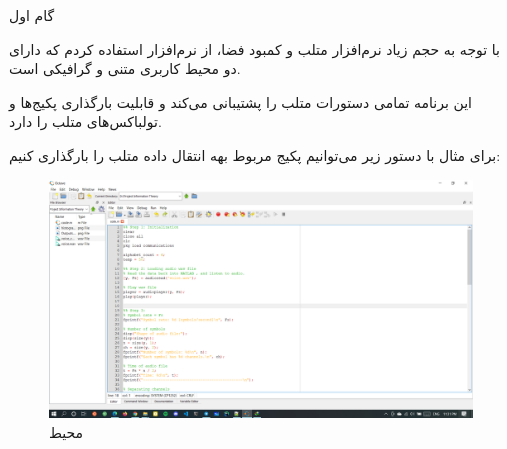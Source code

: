 \Problem
{گام اول}
{
    با توجه به حجم زیاد نرم‌افزار متلب و کمبود فضا، از نرم‌افزار 
    استفاده کردم که دارای دو محیط کاربری متنی و گرافیکی است.
    
    این برنامه تمامی دستورات متلب را پشتیبانی می‌کند و قابلیت بارگذاری پکیج‌ها و تولباکس‌های متلب را دارد. 
    
    برای مثال با دستور زیر می‌توانیم پکیج مربوط بهه انتقال داده متلب را بارگذاری کنیم:
    
    
    \begin{figure}[H]
        \includegraphics[width=15cm]{Images/Octave.png}
        \centering
        \caption{محیط }
    \end{figure}
}
